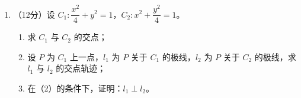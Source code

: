 \documentclass[12pt, a4paper]{ctexart}
\begin{document}
\begin{enumerate}[resume]
\item （12分）设 $C_1: \dfrac{x^2}{4} + y^2 = 1$，$C_2: x^2 + \dfrac{y^2}{4} = 1$。
\begin{enumerate}[label=(\arabic*)]
\item 求 $C_1$ 与 $C_2$ 的交点；
\item 设 $P$ 为 $C_1$ 上一点，$l_1$ 为 $P$ 关于 $C_1$ 的极线，$l_2$ 为 $P$ 关于 $C_2$ 的极线，求 $l_1$ 与 $l_2$ 的交点轨迹；
\item 在（2）的条件下，证明：$l_1 \perp l_2$。
\end{enumerate}

\end{enumerate}
\end{document}
